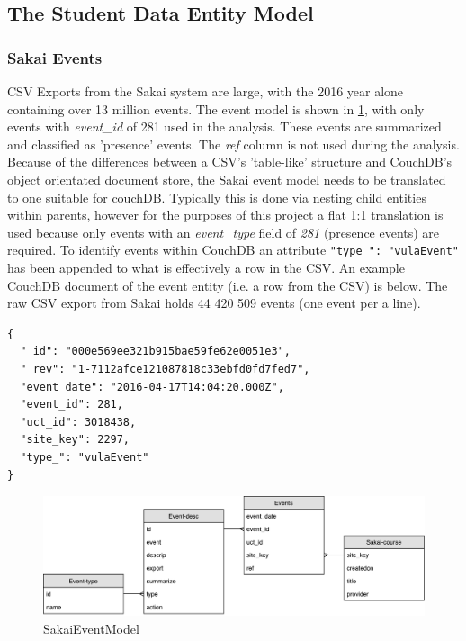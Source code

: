 \subsection{The Student Data Entity Model}

\subsubsection*{Sakai Events}
CSV Exports from the Sakai system are large, with the 2016 year alone containing over 13 million events. The event model is shown in \ref{SakaiEventModel}, with only events with \textit{event\_id} of 281 used in the analysis. These events are summarized and classified as 'presence' events. The \textit{ref} column is not used during the analysis. Because of the differences between a CSV's 'table-like' structure and CouchDB's object orientated document store, the Sakai event model needs to be translated to one suitable for couchDB. Typically this is done via nesting child entities within parents, however for the purposes of this project a flat 1:1 translation is used because only events with an \textit{event\_type} field of \textit{281} (presence events) are required. To identify events within CouchDB an attribute \texttt{{"type\_": "vulaEvent"}} has been appended to what is effectively a row in the CSV. An example CouchDB document of the event entity (i.e. a row from the CSV) is below. The raw CSV export from Sakai holds 44 420 509 events (one event per a line).

\begin{verbatim}
{
  "_id": "000e569ee321b915bae59fe62e0051e3",
  "_rev": "1-7112afce121087818c33ebfd0fd7fed7",
  "event_date": "2016-04-17T14:04:20.000Z",
  "event_id": 281,
  "uct_id": 3018438,
  "site_key": 2297,
  "type_": "vulaEvent"
}
\end{verbatim}

\begin{figure}[h]
  \centering
  \includegraphics[scale=0.4]{./resources/figures/SakaiEvents}
  \caption[SakaiEventModel]{SakaiEventModel}
  \label{SakaiEventModel}
\end{figure}

